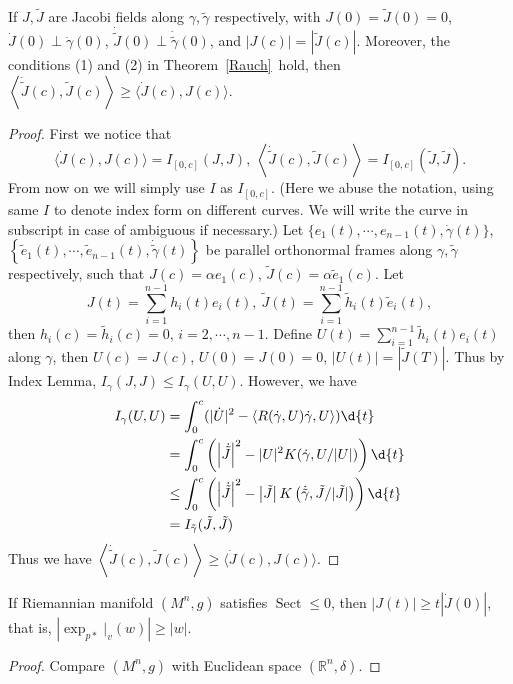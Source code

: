 \begin{lem}\label{compare jacobi fields}
    If $J,\tilde{J}$ are Jacobi fields along $\gamma,\tilde{\gamma}$ respectively, with $J(0)=\tilde{J}(0)=0$, $\dot{J}(0)\perp\dot{\gamma}(0)$, $\dot{\tilde{J}}(0)\perp\dot{\tilde{\gamma}}(0)$, and $|J(c)|=|\tilde{J}(c)|$.
    Moreover, the conditions (1) and (2) in Theorem~\ref{Rauch}~hold, then $\left\langle\dot{\tilde{J}}(c),\tilde{J}(c)\right\rangle\geq\langle\dot{J}(c),J(c)\rangle$.
\end{lem}
\begin{proof}
    First we notice that
    \[\langle\dot{J}(c),J(c)\rangle=I_{[0,c]}(J,J),\ \left\langle\dot{\tilde{J}}(c),\tilde{J}(c)\right\rangle=I_{[0,c]}\left(\tilde{J},\tilde{J}\right).\]
    From now on we will simply use $I$ as $I_{[0,c]}$.
    (Here we abuse the notation, using same $I$ to denote index form on different curves.
    We will write the curve in subscript in case of ambiguous if necessary.)
    Let $\{e_1(t),\cdots,e_{n-1}(t),\dot{\gamma}(t)\}$, $\left\{\tilde{e}_1(t),\cdots,\tilde{e}_{n-1}(t),\dot{\tilde{\gamma}}(t)\right\}$ be parallel orthonormal frames along $\gamma,\tilde{\gamma}$ respectively, such that $J(c)=\alpha e_1(c)$, $\tilde{J}(c)=\alpha\tilde{e}_1(c)$.
    Let
    \[J(t)=\sum_{i=1}^{n-1}h_i(t)e_i(t),\ \tilde{J}(t)=\sum_{i=1}^{n-1}\tilde{h}_i(t)\tilde{e}_i(t),\]
    then $h_i(c)=\tilde{h}_i(c)=0$, $i=2,\cdots,n-1$.
    Define $U(t)=\sum_{i=1}^{n-1}\tilde{h}_i(t)e_i(t)$ along $\gamma$, then $U(c)=J(c)$, $U(0)=J(0)=0$, $|U(t)|=|\tilde{J}(T)|$.
    Thus by Index Lemma, $I_\gamma(J,J)\leq I_\gamma(U,U)$.
    However, we have
    \begin{align*}
        I_\gamma(U,U)&=\int_0^c(|\dot{U}|^2-\langle R(\dot{\gamma},U)\dot{\gamma},U\rangle)\d{t}\\
        &=\int_0^c\left(\left|\dot{\tilde{J}}\right|^2-|U|^2K(\dot{\gamma},U/|U|)\right)\d{t}\\
        &\leq\int_0^c\left(\left|\dot{\tilde{J}}\right|^2-\left|\tilde{J}\right|K\left(\dot{\tilde{\gamma}},\tilde{J}/|\tilde{J}|\right)\right)\d{t}\\
        &=I_{\tilde{\gamma}}(\tilde{J},\tilde{J})
    \end{align*}
    Thus we have $\left\langle\dot{\tilde{J}}(c),\tilde{J}(c)\right\rangle\geq\langle\dot{J}(c),J(c)\rangle$.
\end{proof}

\begin{cor}
    If Riemannian manifold $(M^n,g)$ satisfies $\operatorname{Sect}\leq 0$, then $|J(t)|\geq t|\dot{J}(0)|$, that is, $\left|\exp_{p*}|_v(w)\right|\geq|w|$.
\end{cor}
\begin{proof}
    Compare $(M^n,g)$ with Euclidean space $(\mathbb{R}^n,\delta)$.
\end{proof}

